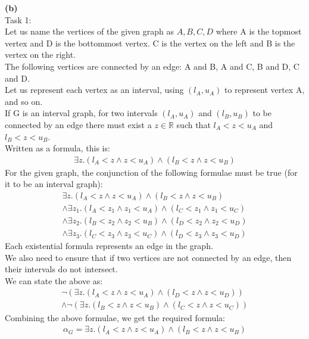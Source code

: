 \documentclass[12pt,letterpaper, onecolumn]{exam}
\begin{document}
\begin{questions}
	\textbf{(b)} \\
	Task 1: \\
	Let us name the vertices of the given graph as $ A, B, C, D $ where A is the topmost vertex and D is the bottommost vertex.
	C is the vertex on the left and B is the vertex on the right. \\
	The following vertices are connected by an edge: A and B, A and C, B and D, C and D. \\
	Let us represent each vertex as an interval, using $ (l_{A}, u_{A}) $ to represent vertex A, and so on. \\
	If G is an interval graph, for two intervals $ (l_{A}, u_{A}) $ and $ (l_{B}, u_{B}) $ to be connected by an edge
	there must exist a $ z \in \mathbb{R} $ such that $ l_{A} < z < u_{A} $ and $ l_{B} < z < u_{B} $. \\
	Written as a formula, this is:
	\begin{align*}
		\exists z. (l_{A} < z \land z < u_{A}) \land (l_{B} < z \land z < u_{B})
	\end{align*}
	For the given graph, the conjunction of the following formulae must be true (for it to be an interval graph):
	\begin{align*}
		\exists z. (l_{A} < z \land z < u_{A}) \land (l_{B} < z \land z < u_{B}) \\
		\land \exists z_1. (l_{A} < z_1 \land z_1 < u_{A}) \land (l_{C} < z_1 \land z_1 < u_{C}) \\
		\land \exists z_2. (l_{B} < z_2 \land z_2 < u_{B}) \land (l_{D} < z_2 \land z_2 < u_{D}) \\
		\land \exists z_3. (l_{C} < z_3 \land z_3 < u_{C}) \land (l_{D} < z_3 \land z_3 < u_{D})
	\end{align*}
	Each existential formula represents an edge in the graph. \\
	We also need to ensure that if two vertices are not connected by an edge, then their intervals do not intersect. \\
	We can state the above as:
	\begin{align*}
		\neg (\exists z. (l_{A} < z \land z < u_{A}) \land (l_{D} < z \land z < u_{D})) \\
		\land \neg (\exists z. (l_{B} < z \land z < u_{B}) \land (l_{C} < z \land z < u_{C}))
	\end{align*}
	Combining the above formulae, we get the required formula:
	\begin{align*}
		\alpha_G = \exists z. (l_{A} < z \land z < u_{A}) \land (l_{B} < z \land z < u_{B}) \\

\end{align*}
\end{questions}
\end{document}
